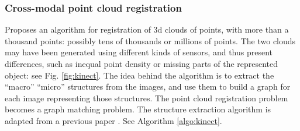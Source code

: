 \documentclass[11pt]{article} %
\begin{document}


    \subsubsection{Cross-modal point cloud registration \cite{huang:kinect}}
Proposes an algorithm for registration of 3d clouds of points, with more than a thousand points: possibly tens of thousands or millions of points. The two clouds may have been generated using different kinds of sensors, and thus present differences, such as inequal point density or missing parts of the represented object: see Fig. \ref{fig:kinect}. The idea behind the algorithm is to extract the ``macro'' ``micro'' structures from the images, and use them to build a graph for each image representing those structures. The point cloud registration problem becomes a graph matching problem. The structure extraction algorithm is adapted from a previous paper \cite{papon:supervoxels}.
See Algorithm \ref{algo:kinect}.
\end{document}
